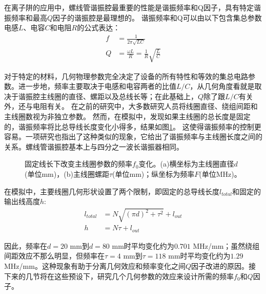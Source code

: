 在离子阱的应用中，螺线管谐振腔最重要的性能是谐振频率和Q因子，具有特定谐振频率和最高$Q$因子的谐振腔是最理想的\cite[]{Siverns_Simkins_Weidt_Hensinger_2012}。
谐振频率和Q可以由以下包含集总参数电感$L$、电容$C$和电阻$R$的公式表达：
\begin{align}
    f&=\frac{1}{2\pi\sqrt{LC}} \label{eq:helical_f_equation}\\
	Q&=\frac{\omega L}{R}=\frac{1}{R}\sqrt{\frac{L}{C}} \label{eq:helical_Q_equation}
\end{align}

对于特定的材料，几何物理参数完全决定了设备的所有特性和等效的集总电路参数。进一步地，频率主要取决于电感和电容两者的比值$L/C$，从几何角度看就是取决于谐振腔主线圈的直径、螺距以及总线长等；在此基础上，$Q$除了跟$L/C$有关外，还与电阻有关。
在之前的研究中，大多数研究人员将线圈直径、绕组间距和主线圈数视为非独立参数\cite[]{Siverns_Simkins_Weidt_Hensinger_2012,Macalpine_Schildknecht_1959}。
然而，在模拟中，发现如果主线圈的总长度是固定的，谐振频率将比总导线长度变化小得多，结果如图\ref{fig:helical_fixedwirelength}。
这使得谐振频率的控制更容易。一项研究\cite[]{Nandi_Sikdar_Das_Ray_2022}也指出了这种类似的现象，它给出了谐振频率与主线圈长度之间的关系。螺线管谐振腔基本上与四分之一波长谐振器相同。
\begin{figure}
    \centering
    \caption[固定线长下改变主线圈参数的频率$f_0$变化]{固定线长下改变主线圈参数的频率$f_0$变化。(a)横坐标为主线圈直径$d$(单位mm)，(b)主线圈螺距$\tau$(单位mm)；纵坐标为频率$F$(单位MHz)。\label{fig:helical_fixedwirelength}}
\end{figure}

在模拟中，主要线圈几何形状设置了两个限制，即固定的总导线长度$l_{total}$和固定的输出线高度$h$:
\begin{align}
    l_{total}&=N\sqrt{(\pi d)^2+\tau^2}+l_{out} \label{eq:helical_fixed_constraints_1}\\
	h&=N\tau+l_{out} \label{eq:helical_fixed_constraints_2}
\end{align}

因此，频率在$d=20$ mm到$d=80$ mm时平均变化约为$0.701$ MHz/mm；虽然绕组间距效应不那么明显，但频率在$\tau=4$ mm到$\tau=118$ mm时平均变化约为$1.29$ MHz/mm。这种现象有助于分离几何效应和频率变化之间$ Q $因子改进的原因。接下来的几节将在这些预设下，研究几个几何参数的效应来设计所需的频率$f_0$和$Q$因子。
